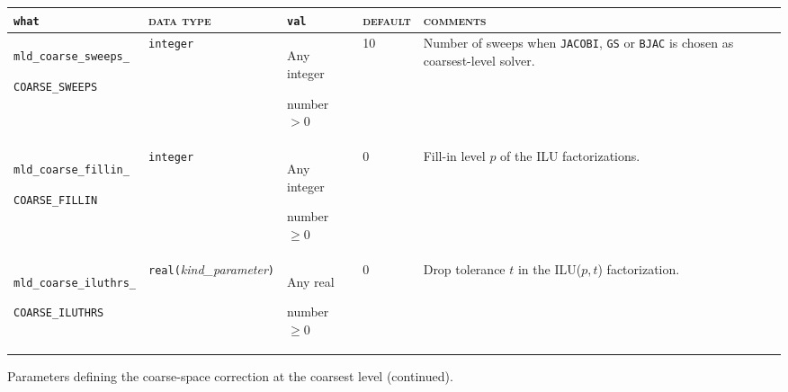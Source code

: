 \bsideways
\begin{center}
\begin{tabular}{|p{3.9cm}|l|p{2cm}|p{1.5cm}|p{7.5cm}|}
\hline
\verb|what|              & \textsc{data type}        &  \verb|val|      &  \textsc{default}  &
\textsc{comments} \\ \hline
\verb|mld_coarse_sweeps_| \par \verb|COARSE_SWEEPS| & \verb|integer|                         
                         & Any integer \par number $> 0$
                         & 10
                         & Number of sweeps when \verb|JACOBI|, \verb|GS| or \verb|BJAC|
                           is chosen as coarsest-level solver. \\ \hline
\verb|mld_coarse_fillin_| \par \verb|COARSE_FILLIN| & \verb|integer|
                         & Any integer \par number $\ge 0$
                         & 0
                         & Fill-in level $p$ of the ILU factorizations. \\ \hline
\verb|mld_coarse_iluthrs_|  \par \verb|COARSE_ILUTHRS|
                         & \verb|real(|\emph{kind\_parameter}\verb|)|
                         & Any real \par number $\ge 0$
                         & 0
                         & Drop tolerance $t$ in the ILU($p,t$) factorization. \\
\hline
\end{tabular}
\end{center}
\caption{Parameters defining the coarse-space correction at the coarsest
level (continued).\label{tab:p_coarse_1}} 
\esideways

